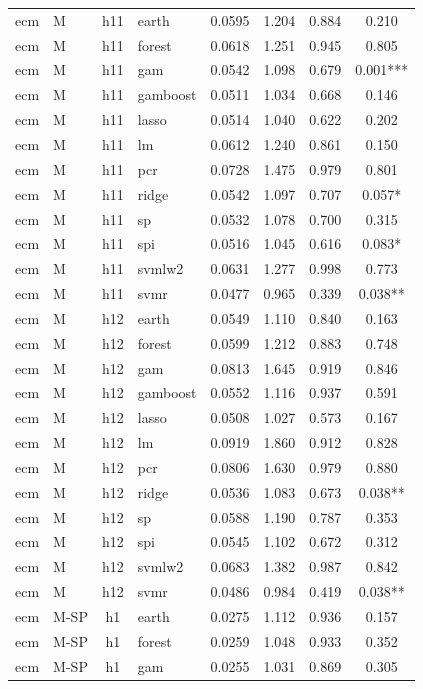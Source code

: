 \begin{ThreePartTable}
\begin{longtable}[t]{llclcccc}
\addlinespace
ecm & M & h11 & earth & 0.0595 & 1.204 & 0.884 & 0.210\\
ecm & M & h11 & forest & 0.0618 & 1.251 & 0.945 & 0.805\\
ecm & M & h11 & gam & 0.0542 & 1.098 & 0.679 & 0.001***\\
ecm & M & h11 & gamboost & 0.0511 & 1.034 & 0.668 & 0.146\\
ecm & M & h11 & lasso & 0.0514 & 1.040 & 0.622 & 0.202\\
ecm & M & h11 & lm & 0.0612 & 1.240 & 0.861 & 0.150\\
ecm & M & h11 & pcr & 0.0728 & 1.475 & 0.979 & 0.801\\
ecm & M & h11 & ridge & 0.0542 & 1.097 & 0.707 & 0.057*\\
ecm & M & h11 & sp & 0.0532 & 1.078 & 0.700 & 0.315\\
ecm & M & h11 & spi & 0.0516 & 1.045 & 0.616 & 0.083*\\
ecm & M & h11 & svmlw2 & 0.0631 & 1.277 & 0.998 & 0.773\\
ecm & M & h11 & svmr & 0.0477 & 0.965 & 0.339 & 0.038**\\
\addlinespace
ecm & M & h12 & earth & 0.0549 & 1.110 & 0.840 & 0.163\\
ecm & M & h12 & forest & 0.0599 & 1.212 & 0.883 & 0.748\\
ecm & M & h12 & gam & 0.0813 & 1.645 & 0.919 & 0.846\\
ecm & M & h12 & gamboost & 0.0552 & 1.116 & 0.937 & 0.591\\
ecm & M & h12 & lasso & 0.0508 & 1.027 & 0.573 & 0.167\\
ecm & M & h12 & lm & 0.0919 & 1.860 & 0.912 & 0.828\\
ecm & M & h12 & pcr & 0.0806 & 1.630 & 0.979 & 0.880\\
ecm & M & h12 & ridge & 0.0536 & 1.083 & 0.673 & 0.038**\\
ecm & M & h12 & sp & 0.0588 & 1.190 & 0.787 & 0.353\\
ecm & M & h12 & spi & 0.0545 & 1.102 & 0.672 & 0.312\\
ecm & M & h12 & svmlw2 & 0.0683 & 1.382 & 0.987 & 0.842\\
ecm & M & h12 & svmr & 0.0486 & 0.984 & 0.419 & 0.038**\\
\addlinespace
ecm & M-SP & h1 & earth & 0.0275 & 1.112 & 0.936 & 0.157\\
ecm & M-SP & h1 & forest & 0.0259 & 1.048 & 0.933 & 0.352\\
ecm & M-SP & h1 & gam & 0.0255 & 1.031 & 0.869 & 0.305\\

\end{longtable}
\end{ThreePartTable}
